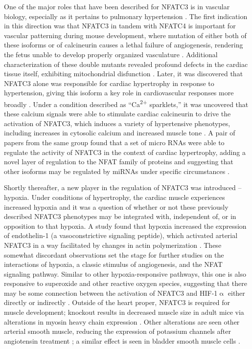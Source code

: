 One of the major roles that have been described for NFATC3 is in vascular biology, especially as it pertains to pulmonary hypertension \citep{NievesCintron2007, NievesCintron2008}. The first indication in this direction was that NFATC3 in tandem with NFATC4 is important for vascular patterning during mouse development, where mutation of either both of these isoforms or of calcineurin causes a lethal failure of angiogenesis, rendering the fetus unable to develop properly organized vasculature \citep{Graef2001}. Additional characterization of these double mutants revealed profound defects in the cardiac tissue itself, exhibiting mitochondrial disfunction \citep{Kegley2001, Bushdid2003}. Later, it was discovered that NFATC3 alone was responsible for cardiac hypertrophy in response to hypertension, giving this isoform a key role in cardiovascular responses more broadly \citep{Wilkins2002}. Under a condition described as ``Ca\textsuperscript{2+} sparklets,'' it was uncovered that these calcium signals were able to stimulate cardiac calcineurin to drive the activation of NFATC3, which induces a variety of hypertensive phenotypes, including increases in cytosolic calcium and increased muscle tone \citep{NievesCintron2007}. A pair of papers from the same group found that a set of micro RNAs were able to regulate the activity of NFATC3 in the context of cardiac hypertrophy, adding a novel layer of regulation to the NFAT family of proteins and suggesting that other isoforms may be regulated by miRNAs under specific circumstances \citep{Lin2009, Wang2010}. 

Shortly thereafter, a new player in the regulation of NFATC3 was introduced -- hypoxia. Under conditions of hypertrophy, the cardiac muscle experiences increased hypoxia and it was a question of whether or not these previously described NFATC3 phenotypes may be integrated with, independent of, or in opposition to that hypoxia. A study found that hypoxia increased the expression of endothelin\hyp{}1 (a vasoconstrictive signaling peptide), which activated arterial NFATC3 in a way facilitated by changes in actin polymerization \citep{deFrutos2011}. These somewhat discordant observations set the stage for further studies on the interactions of hypoxia, a classic stimulus of angiogenesis, and the NFAT signaling pathway. Similar to other hypoxia\hyp{}responsive pathways, this one is also responsive to superoxide and other reactive oxygen species, suggesting that there may be some connection between the activation of NFATC3 and HIF\hyp{}1$\upalpha$ either directly or indirectly \citep{RamiroDiaz2014}. Outside of the heart proper, NFATC3 is required for muscle development; knockout results in decreased muscle size in adult mice via alterations in myosin heavy chain expression \citep{Kegley2001, Delling2000}. Other alterations are seen other arterial smooth muscle, reducing the expression of potassium channels after angiotensin treatment \citep{Stevenson2001, Amberg2004}; a similar effect is seen in bladder smooth muscle cells \citep{Layne2008}. 


